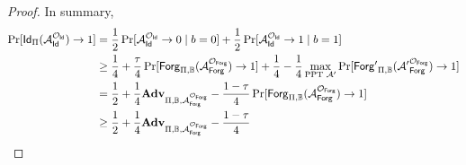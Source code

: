 \begin{proof}
In summary,
\begin{equation*}
	\begin{aligned}
		\Pr[{\sf Id}_{\Pi}(\mathcal{A}_{\sf Id}^{\mathcal{O}_{\sf Id}}) \to 1] 
		&= \frac{1}{2} \Pr[\mathcal{A}_{\sf Id}^{\mathcal{O}_{\sf Id}} \to 0 \mid b = 0] + \frac{1}{2} \Pr[\mathcal{A}_{\sf Id}^{\mathcal{O}_{\sf Id}} \to 1 \mid b = 1] \\
		&\geq \frac{1}{4} + \frac{\tau}{4} \Pr[{\sf Forg}_{\Pi, \mathbb{B}}(\mathcal{A}_{\sf Forg}^{\mathcal{O}_{\sf Forg} }) \to 1 ] + \frac{1}{4} - \frac{1}{4}\max_{\text{PPT } \mathcal{A}'} \Pr[{\sf Forg'}_{\Pi, \mathbb{B}}(\mathcal{A'}_{\sf Forg}^{\mathcal{O}_{\sf Forg} }) \to 1 ] \\
		&= \frac{1}{2} + \frac{1}{4}\mathbf{Adv}_{\Pi, \mathbb{B}, \mathcal{A}_{\sf Forg}^{\mathcal{O}_{\sf Forg}}}  - \frac{1-\tau}{4}\Pr[{\sf Forg}_{\Pi, \mathbb{B}}(\mathcal{A}_{\sf Forg}^{\mathcal{O}_{\sf Forg} }) \to 1 ] \\
		&\geq \frac{1}{2} + \frac{1}{4}\mathbf{Adv}_{\Pi, \mathbb{B}, \mathcal{A}_{\sf Forg}^{\mathcal{O}_{\sf Forg}}}  - \frac{1-\tau}{4}
	\end{aligned}
\end{equation*}

\end{proof}







% 

\nocite{*}
\printbibliography



